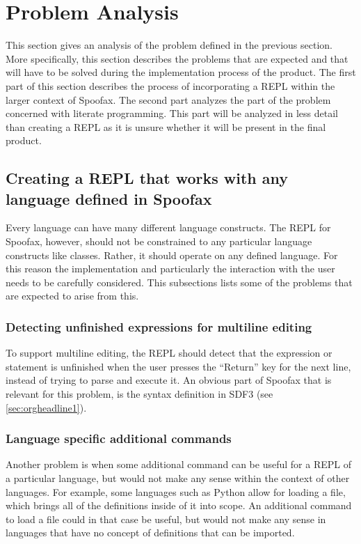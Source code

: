 \section{Problem Analysis}
\label{sec:problem-analysis}
This section gives an analysis of the problem defined in the previous
section. More specifically, this section describes the problems that
are expected and that will have to be solved during the implementation process
of the product. The first part of this section describes the process
of incorporating a REPL within the larger context of
Spoofax. The second part analyzes the part of the problem concerned
with literate programming. This part will be analyzed in less detail
than creating a REPL as it is unsure whether it will be present in
the final product.

\subsection{Creating a REPL that works with any language defined in Spoofax}
\label{ssec:incorp-repl-spoofax}

Every language can have many different language constructs. The REPL for
Spoofax, however, should not be constrained to any particular language
constructs like classes. Rather, it should operate on any defined language. For
this reason the implementation and particularly the interaction with the user
needs to be carefully considered. This subsections lists some of the problems
that are expected to arise from this.

\subsubsection{Detecting unfinished expressions for multiline editing}
\label{sec:detect-unfin-expr}
To support multiline editing, the REPL should detect that the
expression or statement is unfinished when the user presses the
``Return'' key for the next line, instead of trying to parse and
execute it. An obvious part of Spoofax that is relevant for this
problem, is the syntax definition in SDF3 (see
\cref{sec:orgheadline1}).

\subsubsection{Language specific additional commands}
\label{sec:lang-spec-addit}
Another problem is when some additional command can be useful for a
REPL of a particular language, but would not make any sense within the
context of other languages. For example, some languages such as Python
allow for loading a file, which brings all of the definitions inside
of it into scope. An additional command to load a file could in that
case be useful, but would not make any sense in languages that have no
concept of definitions that can be imported.

